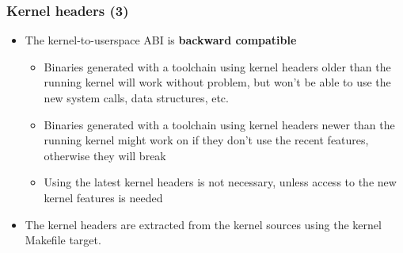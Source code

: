 \begin{frame}
  \frametitle{Kernel headers (3)}
  \begin{itemize}
  \item The kernel-to-userspace ABI is {\bf backward compatible}
    \begin{itemize}
    \item Binaries generated with a toolchain using kernel headers
      older than the running kernel will work without problem, but
      won't be able to use the new system calls, data structures, etc.
    \item Binaries generated with a toolchain using kernel headers
      newer than the running kernel might work on if they don't use
      the recent features, otherwise they will break
    \item Using the latest kernel headers is not necessary, unless
      access to the new kernel features is needed
    \end{itemize}
  \item The kernel headers are extracted from the kernel sources using
    the  kernel Makefile target.
  \end{itemize}
\end{frame}

